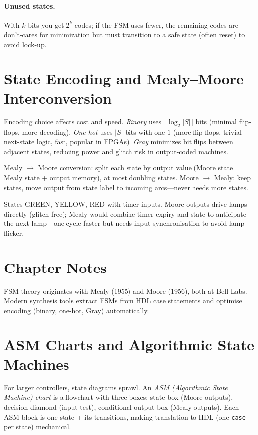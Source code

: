 \paragraph{Unused states.} With $k$ bits you get $2^k$ codes; if the FSM uses fewer, the remaining
codes are don't-cares for minimization but must transition to a safe state (often reset) to avoid lock-up.


\section{State Encoding and Mealy--Moore Interconversion}
Encoding choice affects cost and speed. \emph{Binary} uses $\lceil\log_2|S|\rceil$ bits (minimal flip-flops, more decoding).
\emph{One-hot} uses $|S|$ bits with one $1$ (more flip-flops, trivial next-state logic, fast, popular in FPGAs).
\emph{Gray} minimizes bit flips between adjacent states, reducing power and glitch risk in output-coded machines.

Mealy $\to$ Moore conversion: split each state by output value (Moore state = Mealy state + output memory), at most doubling states.
Moore $\to$ Mealy: keep states, move output from state label to incoming arcs---never needs more states.
\begin{example}
States GREEN, YELLOW, RED with timer inputs. Moore outputs drive lamps directly (glitch-free); Mealy would combine timer expiry and state
to anticipate the next lamp---one cycle faster but needs input synchronisation to avoid lamp flicker.
\end{example}


\section{Chapter Notes}
FSM theory originates with Mealy (1955) and Moore (1956), both at Bell Labs. Modern synthesis tools
extract FSMs from HDL case statements and optimise encoding (binary, one-hot, Gray) automatically.

\section{ASM Charts and Algorithmic State Machines}
For larger controllers, state diagrams sprawl. An \emph{ASM (Algorithmic State Machine) chart} is a flowchart with three boxes:
state box (Moore outputs), decision diamond (input test), conditional output box (Mealy outputs). Each ASM block is one state + its
transitions, making translation to HDL (one \texttt{case} per state) mechanical.

